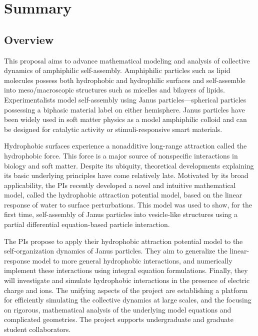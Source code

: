 \documentclass[10pt]{article}
\begin{document}
\section*{Summary}


\subsection*{Overview}
\vspace{-0.1in}
This proposal aims to advance mathematical modeling and analysis of
collective dynamics of amphiphilic self-assembly. Amphiphilic particles
such as lipid molecules possess both hydrophobic and hydrophilic
surfaces and self-assemble into meso/macroscopic structures such as
micelles and bilayers of lipids. Experimentalists model self-assembly
using Janus particles—spherical particles possessing a biphasic material
label on either hemisphere. Janus particles have been widely used in
soft matter physics as a model amphiphilic colloid and can be designed
for catalytic activity or stimuli-responsive smart materials.

Hydrophobic surfaces experience a nonadditive long-range attraction
called the hydrophobic force. This force is a major source of
nonspecific interactions in biology and soft matter. Despite its
ubiquity, theoretical developments explaining its basic underlying
principles have come relatively late. Motivated by its broad
applicability, the PIs recently developed a novel and intuitive
mathematical model, called the hydrophobic attraction potential model,
based on the linear response of water to surface perturbations. This
model was used to show, for the first time, self-assembly of Janus
particles into vesicle-like structures using a partial differential
equation-based particle interaction.

The PIs propose to apply their hydrophobic attraction potential model to
the self-organization dynamics of Janus particles. They aim to
generalize the linear-response model to more general hydrophobic
interactions, and numerically implement these interactions using
integral equation formulations. Finally, they will investigate and
simulate hydrophobic interactions in the presence of electric charge and
ions. The unifying aspects of the project are establishing a platform
for efficiently simulating the collective dynamics at large scales, and
the focusing on rigorous, mathematical analysis of the underlying model
equations and complicated geometries. The project supports undergraduate
and graduate student collaborators.
\end{document}
